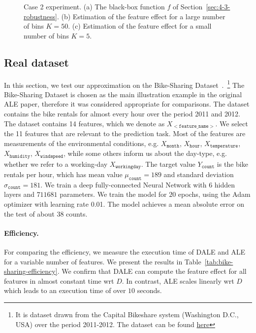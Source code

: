 \documentclass[wcp]{jmlr}
\begin{document}
\begin{figure}[h]
  \begin{center} \resizebox{.33\columnwidth}{!}{} \resizebox{.32\columnwidth}{!}{} \resizebox{.32\columnwidth}{!}{}
  \end{center}
  \caption[Case 2]{Case 2 experiment. (a) The black-box function \(f\) of Section~\ref{sec:4-3-robustness}. (b) Estimation of the feature effect for a large number of bins \(K=50\). (c) Estimation of the feature effect for a small number of bins \(K=5\).}
  \label{fig:example-2-samples}
\end{figure}


\subsection{Real dataset}
\label{sec:5-2-real-datasets} In this section, we test our approximation on the Bike-Sharing Dataset~\cite{BikeSharing}.~\footnote{It is dataset drawn from the Capital Bikeshare system (Washington D.C., USA) over the period 2011-2012. The dataset can be found \href{https://archive.ics.uci.edu/ml/machine-learning-databases/00275/Bike-Sharing-Dataset.zip}{here}} The Bike-Sharing Dataset is chosen as the main illustration example in the original ALE paper, therefore it was considered appropriate for comparisons. The dataset contains the bike rentals for almost every hour over the period 2011 and 2012. The dataset contains 14 features, which we denote as \( X_{\mathtt{<feature\_name>}} \). We select the 11 features that are relevant to the prediction task. Most of the features are measurements of the environmental conditions, e.g.  \(X_{\mathtt{month}}\), \(X_{\mathtt{hour}}\), \(X_{\mathtt{temperature}}\), \(X_{\mathtt{humidity}}\), \(X_{\mathtt{windspeed}}\), while some others inform us about the day-type, e.g. whether we refer to a working-day \(X_{\mathtt{workingday}}\). The target value \( Y_{\mathtt{count}}\) is the bike rentals per hour, which has mean value \(\mu_{\mathtt{count}} = 189\) and standard deviation \(\sigma_{\mathtt{count}} = 181\). We train a deep fully-connected Neural Network with 6 hidden layers and \(711681\) parameters. We train the model for \(20\) epochs, using the Adam optimizer with learning rate 0.01. The model achieves a mean absolute error on the test of about \(38\) counts.

\paragraph{Efficiency.} For comparing the efficiency, we measure the execution time of DALE and ALE for a variable number of features. We present the results in Table~\ref{tab:bike-sharing-efficiency}. We confirm that DALE can compute the feature effect for all features in almost constant time wrt \(D\). In contrast, ALE scales linearly wrt \(D\) which leads to an execution time of over \(10\) seconds.
\end{document}
